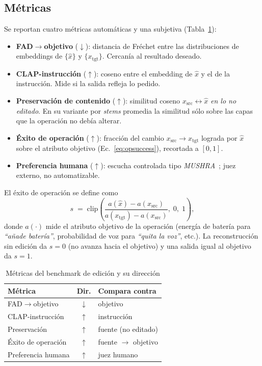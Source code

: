 \subsection{Métricas}
\label{sec:edit:metricas}

Se reportan cuatro métricas automáticas y una subjetiva
(Tabla~\ref{tab:edit-metricas}):

\begin{itemize}
  \item \textbf{FAD$\to$objetivo} ($\downarrow$): distancia de Fréchet entre
        las distribuciones de embeddings de $\{\hat{x}\}$ y $\{x_{\text{tgt}}\}$.
        Cercanía al resultado deseado.
  \item \textbf{CLAP-instrucción} ($\uparrow$): coseno entre el embedding de
        $\hat{x}$ y el de la instrucción. Mide si la salida refleja lo pedido.
  \item \textbf{Preservación de contenido} ($\uparrow$): similitud coseno
        $x_{\text{src}}\!\leftrightarrow\!\hat{x}$ \emph{en lo no editado}.
        En su variante por \textit{stems} promedia la similitud sólo sobre las
        capas que la operación no debía alterar.
  \item \textbf{Éxito de operación} ($\uparrow$): fracción del cambio
        $x_{\text{src}}\!\to\!x_{\text{tgt}}$ lograda por $\hat{x}$ sobre el
        atributo objetivo (Ec.~\ref{eq:opsuccess}), recortada a $[0,1]$.
  \item \textbf{Preferencia humana} ($\uparrow$): escucha controlada tipo
        \textit{MUSHRA}~\cite{series2014method}; juez externo, no automatizable.
\end{itemize}

El éxito de operación se define como
\begin{equation}
  s \;=\; \mathrm{clip}\!\left(
  \frac{a(\hat{x}) - a(x_{\text{src}})}{a(x_{\text{tgt}}) - a(x_{\text{src}})},
  \;0,\;1\right),
  \label{eq:opsuccess}
\end{equation}
donde $a(\cdot)$ mide el atributo objetivo de la operación (energía de batería
para \textit{``añade batería''}, probabilidad de voz para \textit{``quita la
voz''}, etc.). La reconstrucción sin edición da $s=0$ (no avanza hacia el
objetivo) y una salida igual al objetivo da $s=1$.

\begin{table}[t]
  \caption{Métricas del benchmark de edición y su dirección}
  \label{tab:edit-metricas}
  \centering
  \begin{tabular}{lcl}
    \hline
    \textbf{Métrica} & \textbf{Dir.} & \textbf{Compara contra} \\
    \hline
    FAD$\to$objetivo        & $\downarrow$ & objetivo \\
    CLAP-instrucción        & $\uparrow$   & instrucción \\
    Preservación            & $\uparrow$   & fuente (no editado) \\
    Éxito de operación      & $\uparrow$   & fuente $\to$ objetivo \\
    Preferencia humana      & $\uparrow$   & juez humano \\
    \hline
  \end{tabular}
\end{table}

